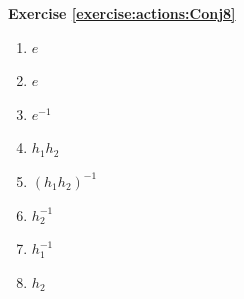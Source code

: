 \noindent\textbf{Exercise \ref{exercise:actions:Conj8}}
%
%
\begin{multicols}{4}
\begin{enumerate}
\item
$e$

\item
$e$

\item
$e^{-1}$

\item
$h_1h_2$ 

\item
$(h_1h_2)^{-1}$

\item
$h_2^{-1}$

\item
$h_1^{-1}$

\item
$h_2$
\end{enumerate}
\end{multicols}

